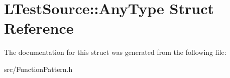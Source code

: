\hypertarget{struct_l_test_source_1_1_any_type}{\section{L\-Test\-Source\-:\-:Any\-Type Struct Reference}
\label{struct_l_test_source_1_1_any_type}
}


The documentation for this struct was generated from the following file\-:\begin{DoxyCompactItemize}
\item 
src/Function\-Pattern.\-h\end{DoxyCompactItemize}
